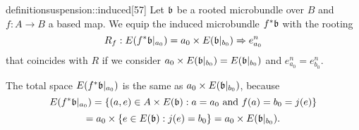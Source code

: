 \begin{mystatement}{definition}{suspension::induced}[57]
    Let $\bb$ be a rooted microbundle over $B$ and $f: A \to B$ a based map.
    We equip the induced microbundle $\ind{f}\bb$ with the rooting
    \[
        \germdef{R_f}{E(\ind{f}\bb[a_0])
        = a_0 \cross E(\bb[b_0])}{e^n_{a_0}}
    \]
    that coincides with $R$ if we consider
    $a_0 \cross E(\bb[b_0]) = E(\bb[b_0])$ and $e^n_{a_0} = e^n_{b_0}$.
\end{mystatement}

\begin{myparagraph}
    The total space $E(\ind{f}\bb[a_0])$ is the same as $a_0 \cross E(\bbb)$, because
    \[ E(\ind{f}\bb[a_0]) = \set{(a, e) \in A \cross E(\bb)}{a = a_0 \tand f(a) = b_0 = j(e)} \]
    \[ = a_0 \cross \set{e \in E(\bb)}{j(e) = b_0} = a_0 \cross E(\bbb). \]
    
\end{myparagraph}